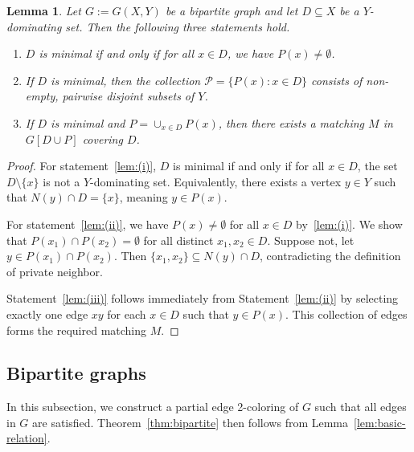 \documentclass[11pt]{article}
\theoremstyle{plain}
\newtheorem{lem}[thm]{Lemma}
\numberwithin{equation}{section}
\begin{document}
\begin{lem}
\label{lem:private-neighbor}
Let $G:=G(X,Y)$ be a bipartite graph and let $D\subseteq X$ be a $Y$-dominating set. Then the following three statements hold.
\begin{enumerate}[label={\rm(\roman*)}, start=1]
\item  $D$ is minimal if and only if for all $x \in D$, we have $P(x)\neq \emptyset$.  \label{lem:(i)}
\item  If $D$ is minimal, then the collection $\mathcal{P}=\{P(x)\colon x\in D\}$ consists of non-empty, pairwise disjoint subsets of $Y$. \label{lem:(ii)}

\item If $D$ is minimal and $P=\cup_{x\in D}P(x)$, then there exists a matching $M$ in $G[D\cup P]$ covering $D$.\label{lem:(iii)}
\end{enumerate}
\end{lem}

\begin{proof}
For statement~\ref{lem:(i)}, $D$ is minimal if and only if for all $x\in D$, the set $D\setminus\{x\}$ is not a $Y$-dominating set. Equivalently, there exists a vertex $y \in Y$ such that $N(y) \cap D = \{x\}$, meaning $y\in P(x)$.

For statement~\ref{lem:(ii)}, we have $P(x) \neq \emptyset$ for all $x \in D$ by~\ref{lem:(i)}. We show that $P(x_1)\cap P(x_2)=\emptyset$ for all distinct $x_1,x_2\in D$. Suppose not, let $y \in P(x_1) \cap P(x_2)$. Then $\{x_1,x_2\}\subseteq N(y) \cap D$, contradicting the definition of private neighbor.

Statement~\ref{lem:(iii)} follows immediately from Statement~\ref{lem:(ii)} by selecting exactly one edge $xy$ for each $x\in D$ such that $y\in P(x)$. This collection of edges forms the required matching $M$.
\end{proof}



\subsection{Bipartite graphs}\label{subsec:bi}

In this subsection, we construct a partial edge 2-coloring of $G$ such that all edges in $G$ are satisfied. Theorem~\ref{thm:bipartite} then follows from Lemma~\ref{lem:basic-relation}.
\end{document}
